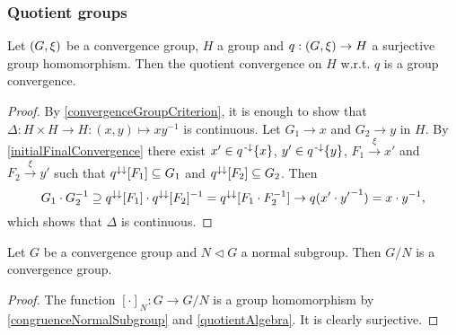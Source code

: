 \subsubsection{Quotient groups}
\begin{proposition} \label{quotientConvergenceGroup}
Let $\sSet{G, \xi}$ be a convergence group, $H$ a group and $q: \sSet{G, \xi} \to H$ a surjective group homomorphism. Then the quotient convergence on $H$ w.r.t. $q$ is a group convergence.
\end{proposition}
\begin{proof}
By \ref{convergenceGroupCriterion}, it is enough to show that $\Delta: H\times H \to H: (x,y) \mapsto xy^{-1}$ is continuous. Let $G_1 \to x$ and $G_2 \to y$ in $H$. By \ref{initialFinalConvergence} there exist $x'\in q^{{\text{\hspace{0.15em}-}\downarrow}}\{x\}$, $y'\in q^{{\text{\hspace{0.15em}-}\downarrow}}\{y\}$, $F_1 \overset{\xi}{\longrightarrow} x'$ and $F_2 \overset{\xi}{\longrightarrow} y'$ such that $q^{\downarrow\downarrow}[F_1] \subseteq G_1$ and $q^{\downarrow\downarrow}[F_2] \subseteq G_2$. Then
\[ G_1\cdot G_2^{-1} \supseteq q^{\downarrow\downarrow}[F_1]\cdot q^{\downarrow\downarrow}[F_2]^{-1} = q^{\downarrow\downarrow}[F_1\cdot F_2^{-1}] \to q(x'\cdot {y'}^{-1}) = x\cdot y^{-1}, \]
which shows that $\Delta$ is continuous.
\end{proof}
\begin{corollary}
Let $G$ be a convergence group and $N\lhd G$ a normal subgroup. Then $G/N$ is a convergence group.
\end{corollary}
\begin{proof}
The function $[\cdot]_N: G\to G/N$ is a group homomorphism by \ref{congruenceNormalSubgroup} and \ref{quotientAlgebra}. It is clearly surjective.
\end{proof}

